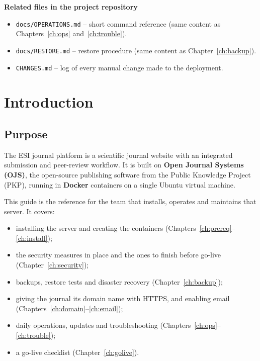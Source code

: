 \documentclass[11pt,a4paper]{report}
\newcommand{\file}[1]{\texttt{\small #1}}
\begin{document}
\vspace{12pt}
\textbf{Related files in the project repository}
\begin{itemize}
  \item \file{docs/OPERATIONS.md} -- short command reference (same content as Chapters~\ref{ch:ops} and~\ref{ch:trouble}).
  \item \file{docs/RESTORE.md} -- restore procedure (same content as Chapter~\ref{ch:backup}).
  \item \file{CHANGES.md} -- log of every manual change made to the deployment.
\end{itemize}

\tableofcontents

\chapter{Introduction}

\section{Purpose}
The ESI journal platform is a scientific journal website with an integrated submission and
peer-review workflow. It is built on \textbf{Open Journal Systems (OJS)}, the open-source
publishing software from the Public Knowledge Project (PKP), running in \textbf{Docker}
containers on a single Ubuntu virtual machine.

This guide is the reference for the team that installs, operates and maintains that server.
It covers:
\begin{itemize}
  \item installing the server and creating the containers (Chapters~\ref{ch:prereq}--\ref{ch:install});
  \item the security measures in place and the ones to finish before go-live (Chapter~\ref{ch:security});
  \item backups, restore tests and disaster recovery (Chapter~\ref{ch:backup});
  \item giving the journal its domain name with HTTPS, and enabling email (Chapters~\ref{ch:domain}--\ref{ch:email});
  \item daily operations, updates and troubleshooting (Chapters~\ref{ch:ops}--\ref{ch:trouble});
  \item a go-live checklist (Chapter~\ref{ch:golive}).
\end{itemize}
\end{document}
